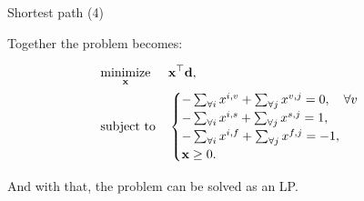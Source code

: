\documentclass{beamer}
\begin{document}
\begin{frame}{Shortest path (4)}
	\begin{flushleft}
		
		
		Together the problem becomes:
		
		\begin{equation} \label{LP}
			\begin{aligned}
				& \underset{\mathbf{x}}{\text{minimize}}
				& & \mathbf{x}^\top \mathbf{d}, \\
				& \text{subject to}
				& & \begin{cases} 
					-\sum_{\forall i} x^{i,v} + \sum_{\forall j} x^{v,j} = 0, \ \ \ \forall v \\ 
					-\sum_{\forall i} x^{i,s} + \sum_{\forall j} x^{s,j} = 1,  \\
					-\sum_{\forall i} x^{i,f} + \sum_{\forall j} x^{f,j} = -1,\\
					\mathbf{x} \geq 0.
				\end{cases}
			\end{aligned}
		\end{equation}
	
		And with that, the problem can be solved as an LP.
		
	\end{flushleft}
\end{frame}



\myqrframe
\end{document}

